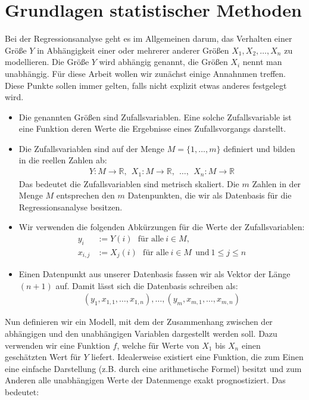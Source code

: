 \chapter{Grundlagen statistischer Methoden}
\label{chapter:2}

Bei der Regressionsanalyse geht es im Allgemeinen darum, das Verhalten einer Größe $Y$ in Abhängigkeit einer oder mehrerer anderer Größen $X_1, X_2, \dots, X_n$ zu modellieren. Die Größe $Y$ wird abhängig genannt, die Größen $X_i$ nennt man unabhängig. Für diese Arbeit wollen wir zunächst einige Annahnmen treffen. Diese Punkte sollen immer gelten, falls nicht explizit etwas anderes festgelegt wird.
\begin{itemize}
    \item Die genannten Größen sind Zufallsvariablen. Eine solche Zufallsvariable ist eine Funktion deren Werte die Ergebnisse eines Zufallsvorgangs darstellt.
    \item Die Zufallsvariablen sind auf der Menge $M = \{1, \dots, m\}$ definiert und bilden in die reellen Zahlen ab:
    \begin{align*}
        Y: M \rightarrow \mathbb{R},~~ X_1: M \rightarrow \mathbb{R},~~ \dots,~~ X_n: M \rightarrow \mathbb{R}
    \end{align*}
    Das bedeutet die Zufallsvariablen sind metrisch skaliert. Die $m$ Zahlen in der Menge $M$ entsprechen den $m$ Datenpunkten, die wir als Datenbasis für die Regressionsanalyse besitzen.
    \item Wir verwenden die folgenden Abkürzungen für die Werte der Zufallsvariablen:
    \begin{align*}
        y_i &:= Y(i) ~~~\text{für alle}~ i \in M,\\
        x_{i, j} &:= X_j(i) ~~~\text{für alle}~ i \in M ~~\text{und}~ 1 \leq j \leq n
    \end{align*}
    \item Einen Datenpunkt aus unserer Datenbasis fassen wir als Vektor der Länge $(n + 1)$ auf. Damit lässt sich die Datenbasis schreiben als:
    \begin{align*}
        (y_1, x_{1,1}, \dots, x_{1,n}), \dots, (y_m, x_{m,1}, \dots, x_{m,n})
    \end{align*}
\end{itemize}
Nun definieren wir ein Modell, mit dem der Zusammenhang zwischen der abhängigen und den unabhängigen Variablen dargestellt werden soll. Dazu verwenden wir eine Funktion $f$, welche für Werte von  $X_1$ bis $X_n$ einen geschätzten Wert für $Y$ liefert. Idealerweise existiert eine Funktion, die zum Einen eine einfache Darstellung (z.B. durch eine arithmetische Formel) besitzt und zum Anderen alle unabhängigen Werte der Datenmenge exakt prognostiziert. Das bedeutet:
